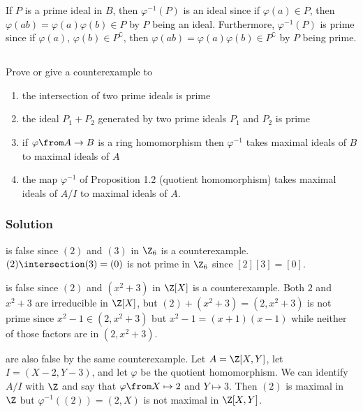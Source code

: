 If $P$ is a prime ideal in $B$, then $\varphi^{-1}(P)$ is an ideal since if $\varphi(a) \in P$, then $\varphi(a b) = \varphi(a) \varphi(b) \in P$ by $P$ being an ideal. Furthermore, $\varphi^{-1}(P)$ is prime since if $\varphi(a)$, $\varphi(b) \in P^\complement$, then $\varphi(a b) = \varphi(a) \varphi(b) \in P^\complement$ by $P$ being prime.



\subsection{}

Prove or give a counterexample to
\begin{enumerate}
	\item the intersection of two prime ideals is prime \label{item:intersection_of_primes_is_prime}
	\item the ideal $P_1 + P_2$ generated by two prime ideals $P_1$ and $P_2$ is prime \label{item:sum_of_primes_is_prime}
	\item if $\varphi \from A \to B$ is a ring homomorphism then $\varphi^{-1}$ takes maximal ideals of $B$ to maximal ideals of $A$ \label{item:phi_inv_takes_maximals_to_maximals}
	\item the map $\varphi^{-1}$ of Proposition 1.2 (quotient homomorphism) takes maximal ideals of $A / I$ to maximal ideals of $A$. \label{item:prop1.2_phi_inv_takes_maximals_to_maximals}
\end{enumerate}

\subsubsection*{Solution}

 is false since $(2)$ and $(3)$ in $\Z_6$ is a counterexample. $(2) \intersection (3) = (0)$ is not prime in $\Z_6$ since $[2] [3] = [0]$.

 is false since $(2)$ and $(x^2 + 3)$ in $\Z[X]$ is a counterexample. Both $2$ and $x^2 + 3$ are irreducible in $\Z[X]$, but $(2) + (x^2 + 3) = (2, x^2 + 3)$ is not prime since $x^2 - 1 \in (2, x^2 + 3)$ but $x^2 - 1 = (x + 1) (x - 1)$ while neither of those factors are in $(2, x^2 + 3)$.

 are also false by the same counterexample. Let $A = \Z[X, Y]$, let $I = (X - 2, Y - 3)$, and let $\varphi$ be the quotient homomorphism. We can identify $A / I$ with $\Z$ and say that $\varphi \from X \mapsto 2$ and $Y \mapsto 3$. Then $(2)$ is maximal in $\Z$ but $\varphi^{-1}\left( (2) \right) = (2, X)$ is not maximal in $\Z[X, Y]$.
















